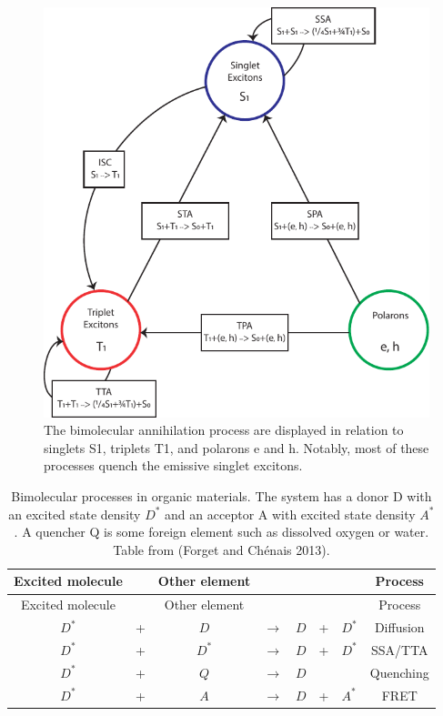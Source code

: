 \documentclass[
  letterpaper,
  DIV=11,
  numbers=noendperiod,
  oneside]{scrreprt}
\begin{document}
\begin{figure}

{\centering \includegraphics{./images/bimoc.pdf}

}

\caption{\label{fig-biomoc}The bimolecular annihilation process are
displayed in relation to singlets {S1}, triplets {T1}, and polarons e
and h. Notably, most of these processes quench the emissive singlet
excitons.}

\end{figure}

\hypertarget{tab:bimoc}{}
\begin{longtable}[]{@{}clcllllc@{}}
\caption{Bimolecular processes in organic materials. The system has a
donor D with an excited state density \(D^*\) and an acceptor A with
excited state density \(A^*\). A quencher Q is some foreign element such
as dissolved oxygen or water. Table from (Forget and Chénais
2013).}\tabularnewline
\toprule()
Excited molecule & & Other element & & & & & Process \\
\midrule()
\endfirsthead
\toprule()
Excited molecule & & Other element & & & & & Process \\
\midrule()
\endhead
\(D^*\) & + & \(D\) & \(\rightarrow\) & \(D\) & + & \(D^*\) &
Diffusion \\
\(D^*\) & + & \(D^*\) & \(\rightarrow\) & \(D\) & + & \(D^*\) &
SSA/TTA \\
\(D^*\) & + & \(Q\) & \(\rightarrow\) & \(D\) & & & Quenching \\
\(D^*\) & + & \(A\) & \(\rightarrow\) & \(D\) & + & \(A^*\) & FRET \\
\bottomrule()
\end{longtable}
\end{document}
